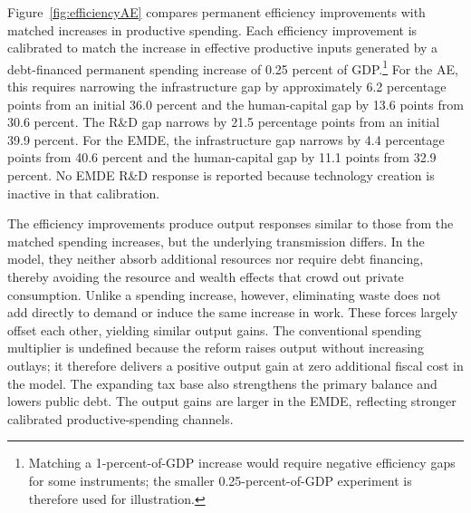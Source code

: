 \documentclass[a4paper,11pt]{article}
\begin{document}
Figure~\ref{fig:efficiencyAE} compares permanent efficiency improvements with matched increases in productive spending.
Each efficiency improvement is calibrated to match the increase in effective productive inputs generated by a debt-financed permanent spending increase of 0.25 percent of GDP.\footnote{Matching a 1-percent-of-GDP increase would require negative efficiency gaps for some instruments; the smaller 0.25-percent-of-GDP experiment is therefore used for illustration.}
For the AE, this requires narrowing the infrastructure gap by approximately 6.2 percentage points from an initial 36.0 percent and the human-capital gap by 13.6 points from 30.6 percent.
The R\&D gap narrows by 21.5 percentage points from an initial 39.9 percent.
For the EMDE, the infrastructure gap narrows by 4.4 percentage points from 40.6 percent and the human-capital gap by 11.1 points from 32.9 percent.
No EMDE R\&D response is reported because technology creation is inactive in that calibration.

The efficiency improvements produce output responses similar to those from the matched spending increases, but the underlying transmission differs.
In the model, they neither absorb additional resources nor require debt financing, thereby avoiding the resource and wealth effects that crowd out private consumption.
Unlike a spending increase, however, eliminating waste does not add directly to demand or induce the same increase in work.
These forces largely offset each other, yielding similar output gains.
The conventional spending multiplier is undefined because the reform raises output without increasing outlays; it therefore delivers a positive output gain at zero additional fiscal cost in the model.
The expanding tax base also strengthens the primary balance and lowers public debt.
The output gains are larger in the EMDE, reflecting stronger calibrated productive-spending channels.
\end{document}
